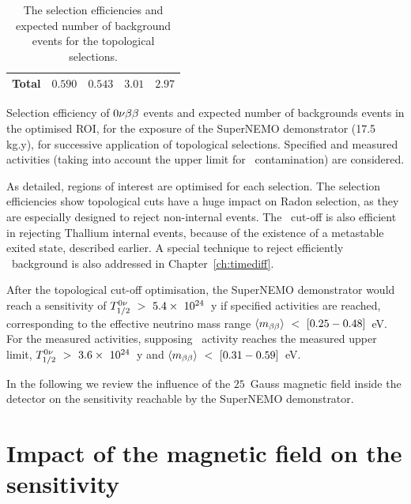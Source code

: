 \begin{table}[h]
\begin{subtable}[h]{1.\textwidth}
\begin{tabular}{|c|c|c|c|c|}
      Total & $0.590$ & $0.543$ & $3.01$ & $2.97$ \\
      \hline
    \end{tabular}
    \captionsetup{justification=justified}
    \caption{Selection efficiency of $0\nu\beta\beta$ events and expected number of backgrounds events in the optimised ROI, for the exposure of the SuperNEMO demonstrator (17.5 kg.y), for successive application of topological selections.
      Specified and measured activities (taking into account the upper limit for \Bi\ contamination) are considered.
      \label{tab:Nexp_topo_contamination}}
  \end{subtable}
  \caption{The selection efficiencies and expected number of background events for the topological selections.}
\end{table}
As detailed, regions of interest are optimised for each selection.
The selection efficiencies show topological cuts have a huge impact on Radon selection, as they are especially designed to reject non-internal events.
The \Pint\ cut-off is also efficient in rejecting Thallium internal events, because of the existence of a metastable exited state, described earlier.
A special technique to reject efficiently \Tl\ background is also addressed in Chapter~\ref{ch:timediff}.

After the topological cut-off optimisation, the SuperNEMO demonstrator would reach a sensitivity of $T_{1/2}^{0\nu}~>~5.4\times~10^{24}$~y if specified activities are reached, corresponding to the effective neutrino mass range $\langle m_{\beta\beta}\rangle~<~[0.25-0.48]$~eV.
For the measured activities, supposing \Bi\ activity reaches the measured upper limit, $T_{1/2}^{0\nu}~>~3.6\times~10^{24}$~y and $\langle m_{\beta\beta}\rangle~<~[0.31-0.59]$~eV.

In the following we review the influence of the $25$~Gauss magnetic field inside the detector on the sensitivity reachable by the SuperNEMO demonstrator.

\section{Impact of the magnetic field on the sensitivity}
\label{subsec:magnetic_field}

